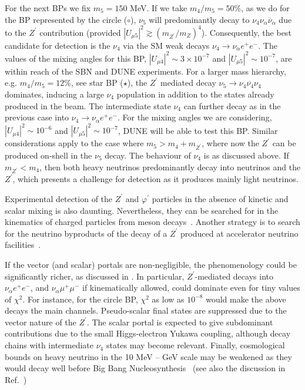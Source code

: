 For the next BPs we fix $m_5 = 150$ MeV. If we take $m_4/m_5 = 50\%$, as we do for the BP represented by the circle ($\circ$), $\nu_5$ will predominantly decay to $\nu_4 \nu_\alpha \overline{\nu}_\alpha$ due to the $Z^\prime$ contribution (provided $|U_{\mu 5}|^2\gtrsim \left( m_{Z^\prime}/m_{Z} \right)^4$). Consequently, the best candidate for detection is the $\nu_4$ via the SM weak decays $\nu_4 \to \nu_\alpha e^+e^-$. The values of the mixing angles for this BP, $|U_{\mu 4}|^2 \sim 3\times 10^{-7}$ and $|U_{\mu 5}|^2 \sim 10^{-7}$, are within reach of the SBN and DUNE experiments. 
For a larger mass hierarchy, e.g. $m_4/m_5 = 12\%$, see star BP ($\star$), the $Z^\prime$ mediated decay $\nu_5 \to \nu_4 \overline{\nu_4} \nu_4$ dominates, inducing a large $\nu_4$ population in addition to the states already produced in the beam. The intermediate state $\nu_4$ can further decay as in the previous case into $\nu_4 \to \nu_\alpha e^+e^-$. For the mixing angles we are considering, $|U_{\mu 4}|^2 \sim 10^{-6}$ and $|U_{\mu 5}|^2 \sim 10^{-7}$, DUNE will be able to test this BP. Similar considerations apply to the case where $m_5 > m_4 + m_{Z^\prime}$, where now the $Z^\prime$ can be produced on-shell in the $\nu_5$ decay. The behaviour of $\nu_4$ is as discussed above. If $ m_{Z^\prime} < m_4$, then both heavy neutrinos predominantly decay into neutrinos and the $Z^\prime$, which presents a challenge for detection as it produces mainly light neutrinos.

Experimental detection of the $Z^\prime$ and $\varphi^\prime$ particles in the absence of kinetic and scalar mixing is also daunting. Nevertheless, they can be searched for in the kinematics of charged particles from meson decays~\cite{Laha:2013xua,Bakhti:2017jhm}. Another strategy is to search for the neutrino byproducts of the decay of a $Z^\prime$ produced at accelerator neutrino facilities~\cite{Bakhti:2018avv}. 

If the vector (and scalar) portals are non-negligible, the phenomenology could be significantly richer, as discussed in \cite{Ballett:2019pyw}. In particular, $Z^\prime$-mediated decays into $\nu_\alpha e^+ e^-$, and $\nu_\alpha \mu^+ \mu^-$ if kinematically allowed, could dominate even for tiny values of $\chi^2$. For instance, for the circle BP, $\chi^2 $ as low as $10^{-8}$ would make the above decays the main channels. Pseudo-scalar final states are suppressed due to the vector nature of the $Z^\prime$. The scalar portal is expected to give subdominant contributions due to the small Higgs-electron Yukawa coupling, although decay chains with intermediate $\nu_4$ states may become relevant. Finally, cosmological bounds on heavy neutrino in the 10 MeV -- GeV scale may be weakened as they would decay well before Big Bang Nucleosynthesis~\cite{Dolgov:2000jw} (see also the discussion in Ref.~\cite{Hannestad:2013ana,*Dasgupta:2013zpn,*Mirizzi:2014ama,*Chu:2015ipa,*Cherry:2016jol,*Chu:2018gxk,*Song:2018zyl})%

